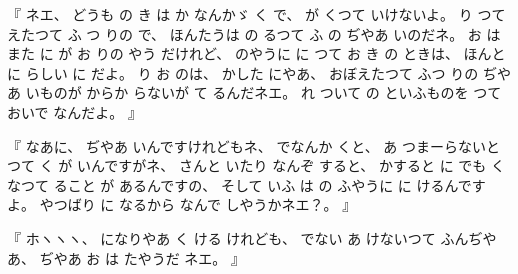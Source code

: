 %
『
ネエ、
%
どうも
の
き
は
か
なんかゞ
く
で、
%
%
が
くつて
いけないよ。
%
り
つて
えたつて%
ふ
つ
りの
で、
%
ほんたうは
の
るつて
ふ
の
ぢやあ
いのだネ。
%
お
は
また
に
が
お
りの
やう
だけれど、
%
のやうに
に
つて
お
き
の
ときは、
%
ほんとに
らしい
%
に
だよ。
%
り
お
のは、
%
かした
にやあ、
%
おぼえたつて
ふつ
りの
ぢやあ
いものが
からか
らないが
て
るんだネエ。
%
れ
ついて
の
といふものを
つて
おいで
なんだよ。
』

%
『
なあに、
%
ぢやあ
いんですけれどもネ、
%
でなんか
%
くと、
%
あ
つまーらないと
つて
く
が
いんですがネ、
%
さんと
いたり
なんぞ
すると、
%
かすると
に%
でも
%
くなつて
ること
が
あるんですの、
%
そして
いふ
は
の
ふやうに
に
けるんですよ。
%
やつばり
に
なるから
なんで
しやうかネエ？。
』

%
『
ホヽヽヽ、
%
になりやあ
く
ける
けれども、
%
でない
あ
けないつて
ふんぢやあ、
%
ぢやあ
お
は
たやうだ
ネエ。
』


